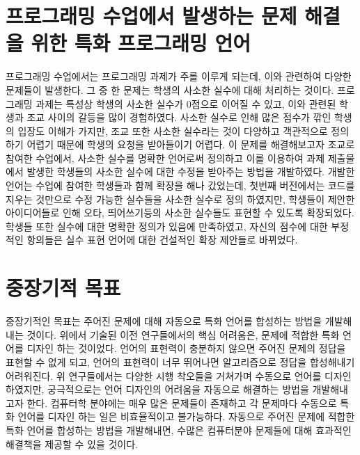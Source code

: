 \documentclass[11pt]{article}
\begin{document}
\begin{spacing}{1.145}
\section{프로그래밍 수업에서 발생하는 문제 해결을 위한 특화 프로그래밍 언어}
%
프로그래밍 수업에서는 프로그래밍 과제가 주를 이루게 되는데, 이와 관련하여 다양한 문제들이 발생한다.
%
그 중 한 문제는 학생의 사소한 실수에 대해 처리하는 것이다.
%
프로그래밍 과제는 특성상 학생의 사소한 실수가 0점으로 이어질 수 있고, 이와 관련된 학생과 조교 사이의 갈등을 많이 경험하였다.
%
사소한 실수로 인해 많은 점수가 깎인 학생의 입장도 이해가 가지만, 조교 또한 사소한 실수라는 것이 다양하고 객관적으로 정의하기 어렵기 때문에 학생의 요청을 받아들이기 어렵다.
%
이 문제를 해결해보고자 조교로 참여한 수업에서, 사소한 실수를 명확한 언어로써 정의하고 이를 이용하여 과제 제출물에서 발생한 학생들의 사소한 실수에 대한 수정을 받아주는 방법을 개발하였다.
%
개발한 언어는 수업에 참여한 학생들과 함께 확장을 해나 갔었는데, 첫번째 버전에서는 코드를 지우는 것만으로 수정 가능한 실수들을 사소한 실수로 정의 하였지만, 학생들이 제안한 아이디어들로 인해 오타, 띄어쓰기등의 사소한 실수들도 표현할 수 있도록 확장되었다.
%
학생들 또한 실수에 대한 명확한 정의가 있음에 만족하였고, 자신의 점수에 대한 부정적인 항의들은 실수 표현 언어에 대한 건설적인 확장 제안들로 바뀌었다.


\section{중장기적 목표}
%
중장기적인 목표는 주어진 문제에 대해 자동으로 특화 언어를 합성하는 방법을 개발해내는 것이다.
%
위에서 기술된 이전 연구들에서의 핵심 어려움은, 문제에 적합한 특화 언어를 디자인 하는 것이었다.
%
언어의 표현력이 충분하지 않으면 주어진 문제의 정답을 표현할 수 없게 되고, 언어의 표현력이 너무 뛰어나면 알고리즘으로 정답을 합성해내기 어려워진다.
%
위 연구들에서는 다양한 시행 착오들을 거쳐가며 수동으로 언어를 디자인 하였지만, 궁극적으로는 언어 디자인의 어려움을 자동으로 해결하는 방법을 개발해내고자 한다.
%
컴퓨터학 분야에는 매우 많은 문제들이 존재하고 각 문제마다 수동으로 특화 언어를 디자인 하는 일은 비효율적이고 불가능하다.
%
자동으로 주어진 문제에 적합한 특화 언어를 합성하는 방법을 개발해내면, 수많은 컴퓨터분야 문제들에 대해 효과적인 해결책을 제공할 수 있을 것이다.












\end{spacing}
\end{document}

